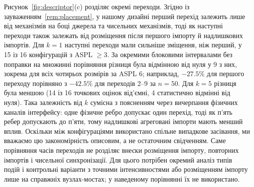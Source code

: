 Рисунок~\ref{fig:descriptor}(c) розділяє окремі переходи. Згідно із зауваженням~\ref{rem:placement}, у нашому дизайні перший перехід залежить лише від механізмів на боці джерела та чисельних механізмів, тоді як наступні переходи також залежать від розміщення після першого імпорту й надлишкових імпортів. Для $k=1$ наступні переходи мали сильніше зміщення, ніж перший, у 15 із 16 конфігурацій з ASPL $\ge3$. За окремими блоковими інтервалами без поправки на множинні порівняння різниця була відмінною від нуля у 9 з них, зокрема для всіх чотирьох розмірів за ASPL 6; наприклад, $-27.5\%$ для першого переходу порівняно з $-42.5\%$ для переходів 2--9 за $n=50$. Для $k=5$ різниця була меншою (14 із 16 точкових оцінок від'ємні, 4 статистично відмінні від нуля). Така залежність від $k$ сумісна з поясненням через вичерпання фізичних каналів інтерфейсу: одне фізичне ребро допускає один перехід, тоді як п'ять ребер допускають до п'яти, тому надлишкові агреговані імпорти мають менший вплив. Оскільки між конфігураціями використано спільне випадкове засівання, ми вважаємо цю закономірність описовим, а не остаточним свідченням. Саме порівняння часів переходів не розділяє внески розміщення імпорту, повторних імпортів і чисельної синхронізації. Для цього потрібен окремий аналіз типів подій і контрольні варіанти з точними інтенсивностями або розміщенням імпорту лише на справжніх вузлах-мостах; у наведеному порівнянні їх не використано.
